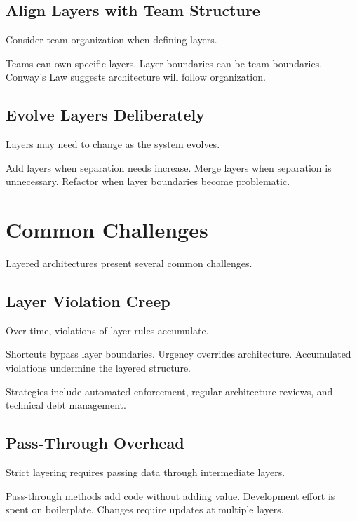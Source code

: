 \documentclass[11pt]{article}
\begin{document}
\subsection{Align Layers with Team Structure}

Consider team organization when defining layers.

Teams can own specific layers. Layer boundaries can be team boundaries. Conway's Law suggests architecture will follow organization.

\subsection{Evolve Layers Deliberately}

Layers may need to change as the system evolves.

Add layers when separation needs increase. Merge layers when separation is unnecessary. Refactor when layer boundaries become problematic.

\section{Common Challenges}

Layered architectures present several common challenges.

\subsection{Layer Violation Creep}

Over time, violations of layer rules accumulate.

Shortcuts bypass layer boundaries. Urgency overrides architecture. Accumulated violations undermine the layered structure.

Strategies include automated enforcement, regular architecture reviews, and technical debt management.

\subsection{Pass-Through Overhead}

Strict layering requires passing data through intermediate layers.

Pass-through methods add code without adding value. Development effort is spent on boilerplate. Changes require updates at multiple layers.
\end{document}

